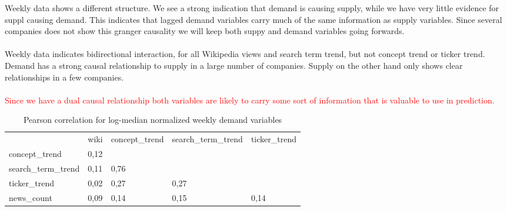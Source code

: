Weekly data shows a different structure. We see a strong indication that demand is causing supply, while we have very little evidence for suppl causing demand. This indicates that lagged demand variables carry much of the same information as supply variables. Since several companies does not show this granger causality we will keep both suppy and demand variables going forwards. 
\\\\
Weekly data indicates bidirectional interaction, for all Wikipedia views and search term trend, but not concept trend or ticker trend. Demand has a strong causal relationship to supply in a large number of companies. Supply on the other hand only shows clear relationships in a few companies.  
\\\\
\textcolor{red}{Since we have a dual causal relationship both variables are likely to carry some sort of information that is valuable to use in prediction. }

\clearpage

\begin{table}[]
\caption{Pearson correlation for log-median normalized weekly demand variables} \label{tab:inf_demand_cor_weekly} 
\centering
\begin{tabular}{lllll}
\hline
 & wiki & concept\_trend & search\_term\_trend & ticker\_trend \\
concept\_trend & 0,12 &  & &  &  \\
search\_term\_trend & 0,11 & 0,76 &  & & \\
ticker\_trend & 0,02 & 0,27 & 0,27 &  &  \\
news\_count & 0,09 & 0,14 & 0,15 & 0,14 & \\ \hline

\end{tabular}%

\end{table}

\begin{table}[]
\caption{Granger causality for log-median normalized weekly data} \label{tab:gr_caus_weekly}
\centering
{}
\end{table}

\cleardoublepage